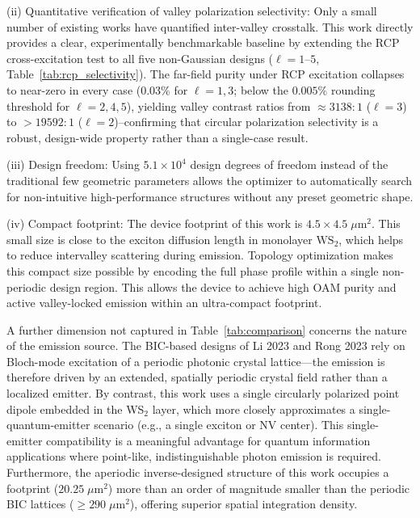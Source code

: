 (ii) Quantitative verification of valley polarization selectivity: Only a small number of existing works have quantified inter-valley crosstalk. This work directly provides a clear, experimentally benchmarkable baseline by extending the RCP cross-excitation test to all five non-Gaussian designs ($\ell = 1$--$5$, Table~\ref{tab:rcp_selectivity}). The far-field purity under RCP excitation collapses to near-zero in every case (0.03\% for $\ell = 1, 3$; below the $0.005\%$ rounding threshold for $\ell = 2, 4, 5$), yielding valley contrast ratios from $\approx 3138{:}1$ ($\ell = 3$) to ${>}19592{:}1$ ($\ell = 2$)--confirming that circular polarization selectivity is a robust, design-wide property rather than a single-case result.

(iii) Design freedom: Using $5.1\times10^4$ design degrees of freedom instead of the traditional few geometric parameters allows the optimizer to automatically search for non-intuitive high-performance structures without any preset geometric shape.

(iv) Compact footprint: The device footprint of this work is $4.5 \times 4.5\;\mu\text{m}^2$. This small size is close to the exciton diffusion length in monolayer $\text{WS}_2$, which helps to reduce intervalley scattering during emission. Topology optimization makes this compact size possible by encoding the full phase profile within a single non-periodic design region. This allows the device to achieve high OAM purity and active valley-locked emission within an ultra-compact footprint.

A further dimension not captured in Table~\ref{tab:comparison} concerns the nature of the emission source. The BIC-based designs of Li 2023 and Rong 2023 rely on Bloch-mode excitation of a periodic photonic crystal lattice---the emission is therefore driven by an extended, spatially periodic crystal field rather than a localized emitter. By contrast, this work uses a single circularly polarized point dipole embedded in the WS$_2$ layer, which more closely approximates a single-quantum-emitter scenario (e.g., a single exciton or NV center). This single-emitter compatibility is a meaningful advantage for quantum information applications where point-like, indistinguishable photon emission is required. Furthermore, the aperiodic inverse-designed structure of this work occupies a footprint ($20.25\;\mu\text{m}^2$) more than an order of magnitude smaller than the periodic BIC lattices ($\ge 290\;\mu\text{m}^2$), offering superior spatial integration density.

